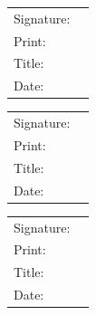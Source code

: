 \documentclass[a4paper,12pt]{article}
\begin{document}
\vspace{1cm}
\begin{tabular}{@{}p{.75in}p{4in}@{}}
Signature: & \hrulefill \\
Print: & \hrulefill \\
Title: & \hrulefill \\
Date: & \hrulefill \\
\end{tabular}

\vspace{1cm}
\begin{tabular}{@{}p{.75in}p{4in}@{}}
Signature: & \hrulefill \\
Print: & \hrulefill \\
Title: & \hrulefill \\
Date: & \hrulefill \\
\end{tabular}

\vspace{1cm}
\begin{tabular}{@{}p{.75in}p{4in}@{}}
Signature: & \hrulefill \\
Print: & \hrulefill \\
Title: & \hrulefill \\
Date: & \hrulefill \\
\end{tabular}

\newpage


\end{document}
